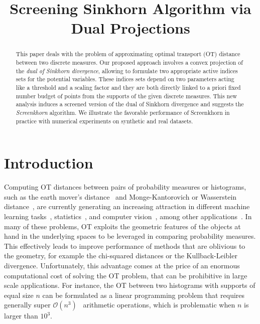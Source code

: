 \documentclass{article}
\title{Screening Sinkhorn Algorithm via Dual Projections}
\newcommand{\bigO}{\mathcal{O}}
\begin{document}
\maketitle

\begin{abstract}

This paper deals with the problem of approximating optimal transport (OT) distance between two discrete measures.
Our proposed approach involves a convex projection of the \emph{dual of Sinkhorn divergence}, allowing to formulate two appropriate active indices sets for the potential variables.
These indices sets depend on two parameters acting like a threshold and a scaling factor and they are both directly linked to a priori fixed number budget of points from the supports of the given discrete measures.
This new analysis induces a screened version of the dual of Sinkhorn divergence and suggests the \emph{Screenkhorn} algorithm.
We illustrate the favorable performance of Screenkhorn in practice with numerical experiments on synthetic and real datasets.
\end{abstract}

\section{Introduction}

Computing OT distances between pairs of probability measures or histograms, such as the earth mover's distance~\cite{werman1985,Rubner2000} and Monge-Kantorovich or Wasserstein distance~\cite{villani09optimal}, are currently generating an increasing attraction in different machine learning tasks~\cite{pmlr-v32-solomon14,kusnerb2015,pmlr-v70-arjovsky17a,ho2017}, statistics~\cite{frogner2015nips,panaretos2016,ebert2017ConstructionON,bigot2017,flamary2018WDA}, and computer vision~\cite{bonnel2011,Rubner2000,solomon2015}, among other applications~\cite{klouri17,peyre2019COTnowpublisher}.
In many of these problems, OT exploits the geometric features of the objects at hand in the underlying spaces to be leveraged in comparing probability measures.
This effectively leads to improve performance of methods that are oblivious to the geometry, for example the chi-squared distances or the Kullback-Leibler divergence.
Unfortunately, this advantage comes at the price of an enormous computational cost of solving the OT problem, that can be prohibitive in large scale applications.
For instance, the OT between two histograms with supports of equal size $n$ can be formulated as a linear programming problem that requires generally super $\bigO(n^3)$~\cite{pele2009} arithmetic operations, which is problematic when $n$ is larger than $10^3.$
\end{document}
